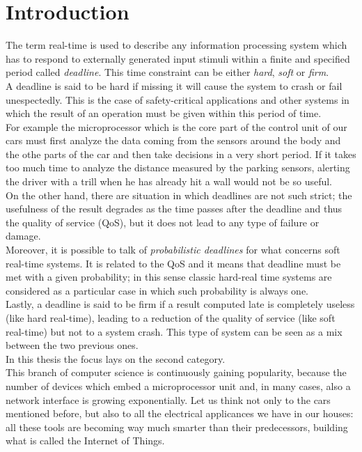 \chapter{Introduction}\label{chp:introduction}


The term real-time is used to describe any information processing system which has to respond to externally generated input stimuli within a finite and specified period called \emph{deadline}.
This time constraint can be either \emph{hard}, \emph{soft} or \emph{firm}.\\
A deadline is said to be hard if missing it will cause the system to crash or fail unespectedly. This is the case of safety-critical applications and other systems in which the result of an operation must be given within this period of time.\\
For example the microprocessor which is the core part of the control unit of our cars must first analyze the data coming from the sensors around the body and the othe parts of the car and then take decisions in a very short period. If it takes too much time to analyze the distance measured by the parking sensors, alerting the driver with a trill when he has already hit a wall would not be so useful.\\
On the other hand, there are situation in which deadlines are not such strict; the usefulness of the result degrades as the time passes after the deadline and thus the quality of service (QoS), but it does not lead to any type of failure or damage.\\
Moreover, it is possible to talk of \emph{probabilistic deadlines} for what concerns soft real-time systems. It is related to the QoS and it means that deadline must be met with a given probability; in this sense classic hard-real time systems are considered as a particular case in which such probability is always one.\\ 
Lastly, a deadline is said to be firm if a result computed late is completely useless (like hard real-time), leading to a reduction of the quality of service (like soft real-time) but not to a system crash. This type of system can be seen as a mix between the two previous ones.\\
In this thesis the focus lays on the second category.\\
This branch of computer science is continuously gaining popularity, because the number of devices which embed a microprocessor unit and, in many cases, also a network interface is growing exponentially. Let us think not only to the cars mentioned before, but also to all the electrical applicances we have in our houses: all these tools are becoming way much smarter than their predecessors, building what is called the Internet of Things.    